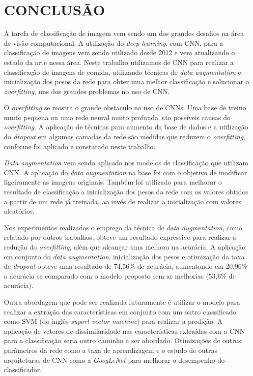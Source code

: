 
\chapter{CONCLUSÃO}
\label{chap:conclusao}

A tarefa de classificação de imagem vem sendo um dos grandes desafios na área de visão computacional. A utilização do \textit{deep learning}, com CNN, para a classificação de imagens vem sendo utilizado desde 2012 e vem atualizando o estado da arte nessa área. Neste trabalho utilizamos de CNN para realizar a classificação de imagens de comida, utilizando técnicas de \textit{data augmentation} e inicialização dos pesos da rede para obter uma melhor classificação e solucionar o \textit{overfitting}, uns dos grandes problemas no uso de CNN.
\par O \textit{overfitting} se mostra o grande obstaculo no uso de CNNs. Uma base de treino muito pequena ou uma rede neural muito profunda~são possíveis causas do \textit{overfitting}. A aplicação de técnicas para aumento da base de dados e a utilização do \textit{dropout} em algumas camadas da rede são medidas que reduzem o \textit{overfitting}, conforme foi aplicado e constatado neste trabalho.
\par \textit{Data augmentation} vem sendo aplicado nos modelos de classificação que utilizam CNN. A aplicação do \textit{data augmentation} na base foi com o objetivo de modificar ligeiramente as imagens originais. Também foi utilizado para melhorar o resultado de classificação a inicialização dos pesos da rede com os valores obtidos a partir de um rede já treinada, ao invés de realizar a inicialização com valores aleatórios.   
\par Nos experimentos realizados o emprego da técnica de \textit{data augmentation}, como relatado por outros trabalhos, obteve um resultado expressivo para realizar a redução do \textit{overfitting}, além que alcançar uma melhora na acurácia. A aplicação em conjunto do \textit{data augmentation}, inicialização dos pesos e otimização da taxa de \textit{dropout} obteve uma resultado de 74,56\% de acurácia, aumentando em 20,96\% a acurácia se comparado com o modelo proposto sem as melhorias (53,6\% de acurácia).
\par Outra abordagem que pode ser realizada futuramente é utilizar o modelo para realizar a extração das características em conjunto com um outro classificado como SVM (do inglês \textit{suport vector machine}) para realizar a predição. A aplicação de vetores de dissimilaridade nas características extraídas com a CNN para a classificação seria outro caminho a ser abordado. Otimizações de outros parâmetros da rede como a taxa de aprendizagem e o estudo de outras arquiteturas de CNN como a \textit{GoogLeNet} \cite{szegedy2015going} para melhorar o desempenho do classificador.